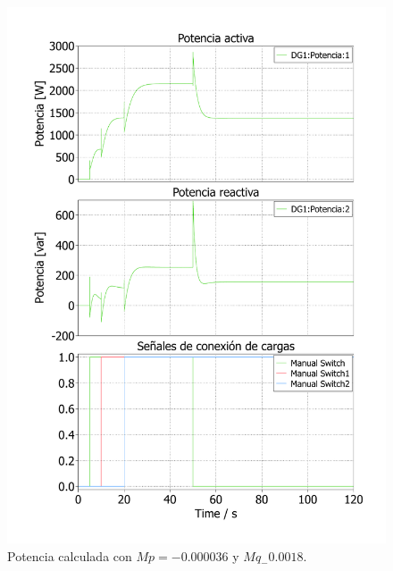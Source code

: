 \begin{figure}
   \centering
   \includegraphics[width=0.5\linewidth]{Tarea 1/report/imagenes/p3a/droop_3.pdf}
   \caption{Potencia calculada con $Mp = -0.000036$ y $Mq_-0.0018$.}
   \label{droop_3}
\end{figure}